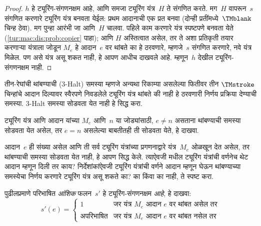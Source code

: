 \documentclass[../../../include/open-logic-section]{subfiles}
\begin{document}
\begin{proof}
$h$ हे ट्यूरिंग-संगणनक्षम आहे, आणि समजा
ट्यूरिंग यंत्र~$H$ ते संगणित करते.
मग~$H$ वापरून~$s$ संगणित करणारे ट्यूरिंग
यंत्र बनवता येईल: प्रथम आदानाची एक प्रत
बनवा (दोन्ही प्रतींमध्ये~$\TMblank$ चिन्ह
ठेवा). मग पुन्हा आरंभी जा आणि~$H$
चालवा. पहिले काम करणारे यंत्र स्पष्टपणे
बनवता येते (\cref{tur:mac:dis:prob:copier}
पाहा); आणि $H$ अस्तित्वात असेल, तर
ते अशा प्रतिकृती तयार करणाऱ्या यंत्राला
जोडून $M_e$ हे आदान~$e$ वर थांबते
का हे ठरवणारे, म्हणजे~$s$ संगणित
करणारे, नवे यंत्र मिळेल. पण असे यंत्र
असू शकत नाही, हे आपण आधीच दाखवले
आहे. म्हणून~$h$ देखील ट्यूरिंग-संगणनक्षम
नाही.
\end{proof}

\begin{prob}
तीन-रेघांची थांबण्याची (3-Halt) समस्या
म्हणजे अन्यथा रिकाम्या असलेल्या फितीवर
तीन $\TMstroke$ चिन्हांचे आदान दिल्यावर
स्वैरपणे निवडलेले ट्यूरिंग यंत्र थांबते
की नाही हे ठरवणारी निर्णय प्रक्रिया
देण्याची समस्या. 3-Halt समस्या
सोडवता येत नाही हे सिद्ध करा.
\end{prob}

\begin{prob}
ट्यूरिंग यंत्र आणि आदान यांच्या
$M_e$ आणि~$n$ या जोड्यांसाठी,
$e \neq n$ असताना थांबण्याची समस्या
सोडवता येत असेल, तर $e = n$
असलेल्या बाबतीतही ती सोडवता
येते, हे दाखवा.
\end{prob}

\begin{prob}
आदान~$e$ ही संख्या असेल आणि ती
सर्व ट्यूरिंग यंत्रांच्या प्रगणनाद्वारे
यंत्र~$M_e$ ओळखून देत असेल,
तर थांबण्याची समस्या सोडवता
येत नाही, हे आपण सिद्ध केले.
त्याऐवजी 
मधील ट्यूरिंग यंत्रांची वर्णनेच
थेट आदान म्हणून दिली तर काय?
निर्देशांकांऐवजी ट्यूरिंग यंत्रांची
वर्णने आदान म्हणून घेऊन थांबण्याच्या
समस्येचा निर्णय करणारे ट्यूरिंग
यंत्र असू शकते का? का किंवा
का नाही, ते स्पष्ट करा.
\end{prob}

\begin{prob} पुढीलप्रमाणे परिभाषित
  \emph{आंशिक} फलन~$s'$ हे
  ट्यूरिंग-संगणनक्षम \emph{आहे},
  हे दाखवा:
  \[
  s'(e) =
  \begin{cases}
    \text{1} & \text{जर यंत्र~$M_e$ आदान $e$ वर थांबत असेल तर}\\
    \text{अपरिभाषित} & \text{जर यंत्र~$M_e$ आदान $e$ वर थांबत नसेल तर}
  \end{cases}
  \]
\end{prob}
\end{document}
